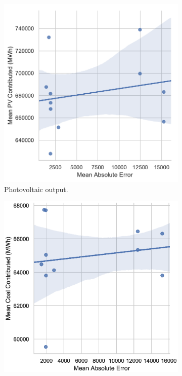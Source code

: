 \documentclass[final,3p,times,twocolumn,numbers]{elsarticle}
\begin{document}
\begin{figure}
\begin{subfigure}[b]{0.475\textwidth}
\centering
\includegraphics[width=\columnwidth]{figures/results/elecsim_results/contributed_PV_mean_output}
\caption{Photovoltaic output.}
\label{fig:contributed_PV_mean_output}
\end{subfigure}
\hfill
\begin{subfigure}[b]{0.475\textwidth}  
\includegraphics[width=\columnwidth]{figures/results/elecsim_results/contributed_Coal_mean_output.eps}

\end{subfigure}
\end{figure}
\end{document}
